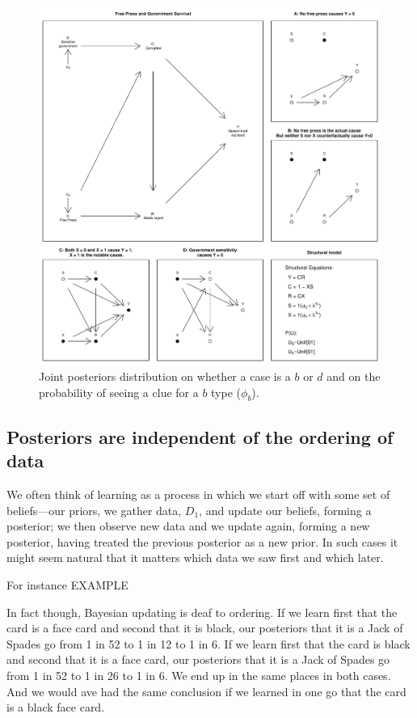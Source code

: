 \documentclass[12pt,]{book}
\begin{document}
\begin{figure}
\centering
\includegraphics{ii_files/figure-latex/unnamed-chunk-21-1.pdf}
\caption{\label{fig:unnamed-chunk-21}\label{fig:correlation} Joint posteriors distribution on whether a case is a \(b\) or \(d\) and on the probability of seeing a clue for a \(b\) type (\(\phi_b\)).}
\end{figure}

\hypertarget{posteriors-are-independent-of-the-ordering-of-data}{%
\subsection{Posteriors are independent of the ordering of data}\label{posteriors-are-independent-of-the-ordering-of-data}}

We often think of learning as a process in which we start off with some set of beliefs---our priors, we gather data, \(D_1\), and update our beliefs, forming a posterior; we then observe new data and we update again, forming a new posterior, having treated the previous posterior as a new prior. In such cases it might seem natural that it matters which data we saw first and which later.

For instance EXAMPLE

In fact though, Bayesian updating is deaf to ordering. If we learn first that the card is a face card and second that it is black, our posteriors that it is a Jack of Spades go from 1 in 52 to 1 in 12 to 1 in 6. If we learn first that the card is black and second that it is a face card, our posteriors that it is a Jack of Spades go from 1 in 52 to 1 in 26 to 1 in 6. We end up in the same places in both cases. And we would ave had the same conclusion if we learned in one go that the card is a black face card.
\end{document}
